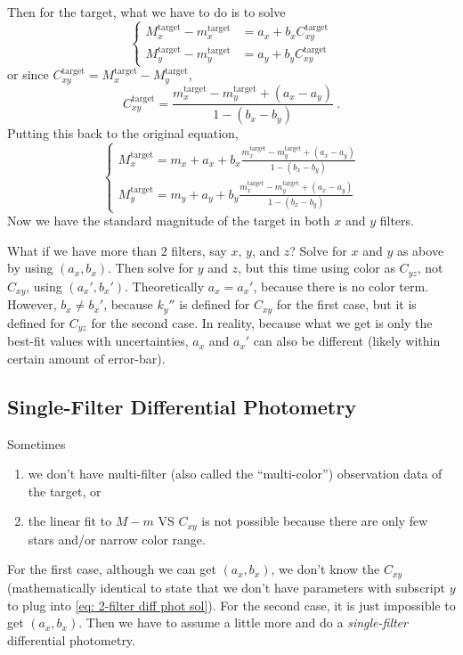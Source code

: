 Then for the target, what we have to do is to solve
\begin{equation}
\begin{cases}
  M_x^\mathrm{target} - m_x^\mathrm{target} &= a_x + b_x C_{xy}^\mathrm{target} \\
  M_y^\mathrm{target} - m_y^\mathrm{target} &= a_y + b_y C_{xy}^\mathrm{target}
\end{cases}
\end{equation}
or since $ C_{xy}^\mathrm{target} = M_x^\mathrm{target} - M_y^\mathrm{target} $,
\begin{equation}
  C_{xy}^\mathrm{target} = \frac{m_x^\mathrm{target} - m_y^\mathrm{target} + (a_x - a_y)}{1 - (b_x - b_y)} ~.
\end{equation}
Putting this back to the original equation,
\begin{equation}\label{eq: 2-filter diff phot sol}
\begin{cases}
  M_x^\mathrm{target}
    = m_x + a_x + b_x \frac{m_x^\mathrm{target} - m_y^\mathrm{target} + (a_x - a_y)}{1 - (b_x - b_y)} \\
  M_y^\mathrm{target}
    = m_y + a_y + b_y \frac{m_x^\mathrm{target} - m_y^\mathrm{target} + (a_x - a_y)}{1 - (b_x - b_y)}
\end{cases}
\end{equation}
Now we have the standard magnitude of the target in both $ x $ and $ y $ filters.

What if we have more than 2 filters, say $ x $, $ y $, and $ z $? Solve for $ x $ and $ y $ as above by using $ (a_x, b_x) $. Then solve for $ y $ and $ z $, but this time using color as $ C_{yz} $, not $ C_{xy} $, using $ (a_x', b_x') $. Theoretically $ a_x = a_x' $, because there is no color term. However, $ b_x \neq b_x' $, because $ k_y'' $ is defined for $ C_{xy} $ for the first case, but it is defined for $ C_{yz} $ for the second case. In reality, because what we get is only the best-fit values with uncertainties, $ a_x $ and $ a_x' $ can also be different (likely within certain amount of error-bar).

\subsection{Single-Filter Differential Photometry}
Sometimes 
\begin{enumerate}
\item we don't have multi-filter (also called the ``multi-color'') observation data of the  target, or
\item the linear fit to $ M - m $ VS $ C_{xy} $ is not possible because there are only few stars and/or narrow color range. 
\end{enumerate}
For the first case, although we can get $ (a_x, b_x) $, we don't know the $ C_{xy} $ (mathematically identical to state that we don't have parameters with subscript $ y $ to plug into \cref{eq: 2-filter diff phot sol}). For the second case, it is just impossible to get $ (a_x, b_x) $. Then we have to assume a little more and do a \textit{single-filter} differential photometry.

